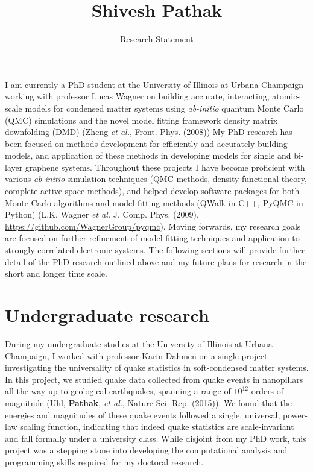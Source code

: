 \documentclass{article}
\title{Shivesh Pathak}
\date{Research Statement}
\begin{document}
\maketitle 

I am currently a PhD student at the University of Illinois at Urbana-Champaign working with professor Lucas Wagner on building accurate, interacting, atomic-scale models for condensed matter systems using \textit{ab-initio} quantum Monte Carlo (QMC) simulations and the novel model fitting framework density matrix downfolding (DMD) (Zheng \textit{et al.}, Front. Phys.  (2008))
My PhD research has been focused on methods development for efficiently and accurately building models, and application of these methods in developing models for single and bi-layer graphene systems.
Throughout these projects I have become proficient with various \textit{ab-initio} simulation techniques (QMC methods, density functional theory, complete active space methods), and helped develop software packages for both Monte Carlo algorithms and model fitting methods (QWalk in C++, PyQMC in Python) (L.K. Wagner \textit{et al.} J.  Comp.  Phys. (2009), \url{https://github.com/WagnerGroup/pyqmc}).
Moving forwards, my research goals are focused on further refinement  of model fitting techniques and application to strongly correlated electronic systems.
The following sections will provide further detail of the PhD research outlined above and my future plans for research in the short and longer time scale.

\section{Undergraduate research}
During my undergraduate studies at the University of Illinois at Urbana-Champaign, I worked with professor Karin Dahmen on a single project investigating the universality of quake statistics in soft-condensed matter systems.
In this project,  we studied quake data collected from quake events in nanopillars all the way up to geological earthquakes, spanning a range of $10^{12}$ orders of magnitude (Uhl, \textbf{Pathak}, \textit{et al.}, Nature Sci. Rep. (2015)).
We found that the energies and magnitudes of these quake events followed a single, universal, power-law scaling function, indicating that indeed quake statistics are scale-invariant and fall formally under a university class.
While disjoint from my PhD work, this project was a stepping stone into developing the computational analysis and programming skills required for my doctoral research.
\end{document}
